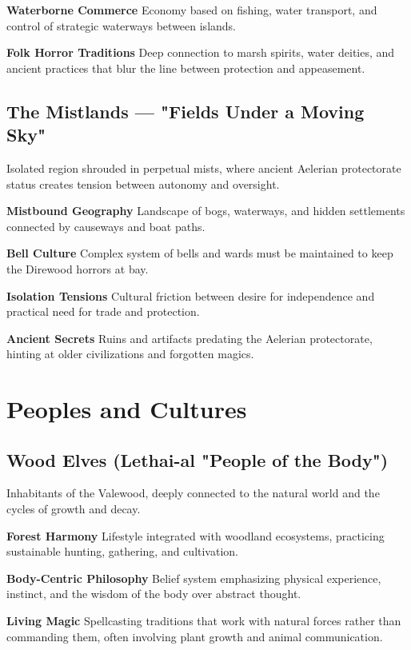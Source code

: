 \documentclass[11pt,twoside,openany]{book}
\begin{document}
\textbf{Waterborne Commerce} Economy based on fishing, water transport, and control of strategic waterways between islands.

\textbf{Folk Horror Traditions} Deep connection to marsh spirits, water deities, and ancient practices that blur the line between protection and appeasement.

\subsection*{The Mistlands — "Fields Under a Moving Sky"}

Isolated region shrouded in perpetual mists, where ancient Aelerian protectorate status creates tension between autonomy and oversight.

\textbf{Mistbound Geography} Landscape of bogs, waterways, and hidden settlements connected by causeways and boat paths.

\textbf{Bell Culture} Complex system of bells and wards must be maintained to keep the Direwood horrors at bay.

\textbf{Isolation Tensions} Cultural friction between desire for independence and practical need for trade and protection.

\textbf{Ancient Secrets} Ruins and artifacts predating the Aelerian protectorate, hinting at older civilizations and forgotten magics.

\section*{Peoples and Cultures} 

\subsection*{Wood Elves (Lethai-al "People of the Body")}

Inhabitants of the Valewood, deeply connected to the natural world and the cycles of growth and decay.

\textbf{Forest Harmony} Lifestyle integrated with woodland ecosystems, practicing sustainable hunting, gathering, and cultivation.

\textbf{Body-Centric Philosophy} Belief system emphasizing physical experience, instinct, and the wisdom of the body over abstract thought.

\textbf{Living Magic} Spellcasting traditions that work with natural forces rather than commanding them, often involving plant growth and animal communication.
\end{document}
